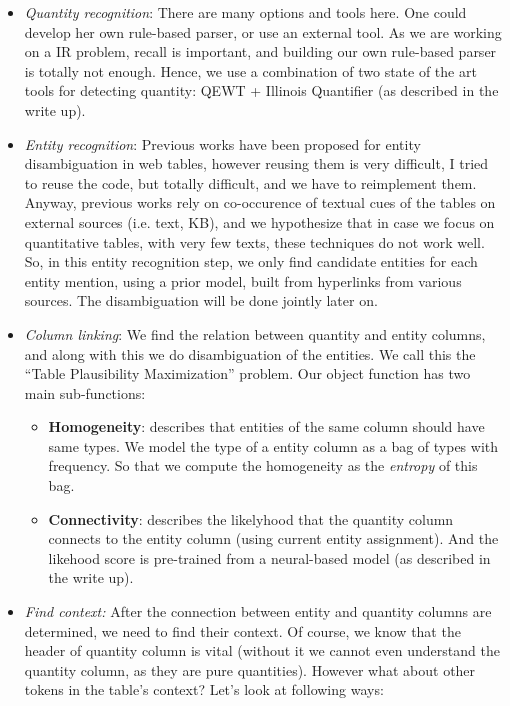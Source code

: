 \documentclass{article}
\begin{document}
\begin{itemize}
\item \textit{Quantity recognition}: There are many options and tools here. One could develop her own rule-based parser, or use an external tool. As we are working on a IR problem, recall is important, and building our own rule-based parser is totally not enough. Hence, we use a combination of two state of the art tools for detecting quantity: QEWT + Illinois Quantifier (as described in the write up).

\item \textit{Entity recognition}: Previous works have been proposed for entity disambiguation in web tables, however reusing them is very difficult, I tried to reuse the code, but totally difficult, and we have to reimplement them. Anyway, previous works rely on co-occurence of textual cues of the tables on external sources (i.e. text, KB), and we hypothesize that in case we focus on quantitative tables, with very few texts, these techniques do not work well. So, in this entity recognition step, we only find candidate entities for each entity mention, using a prior model, built from hyperlinks from various sources. The disambiguation will be done jointly later on.

\item \textit{Column linking}: We find the relation between quantity and entity columns, and along with this we do disambiguation of the entities. We call this the ``Table Plausibility Maximization'' problem. Our object function has two main sub-functions:
\begin{itemize}
\item \textbf{Homogeneity}: describes that entities of the same column should have same types. We model the type of a entity column as a bag of types with frequency. So that we compute the homogeneity as the \textit{entropy} of this bag.
\item \textbf{Connectivity}: describes the likelyhood that the quantity column connects to the entity column (using current entity assignment). And the likehood score is pre-trained from a neural-based model (as described in the write up).
\end{itemize}
\item \textit{Find context:} After the connection between entity and quantity columns are determined, we need to find their context. Of course, we know that the header of quantity column is vital (without it we cannot even understand the quantity column, as they are pure quantities). However what about other tokens in the table's context? Let's look at following ways:


\end{itemize}
\end{document}
